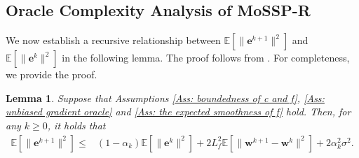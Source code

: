 \documentclass{article}
\theoremstyle{plain}
\newtheorem{lemma}{Lemma}[section]
\theoremstyle{definition}
\theoremstyle{remark}
\newcommand{\EE}{\mathbb{E}}
\newcommand{\be}{\bm{e}}
\newcommand{\bw}{\bm{w}}
\numberwithin{equation}{section}
\begin{document}
\subsection{\bf{Oracle Complexity Analysis of MoSSP-R}}
\label{Subsection: Lemmas for Oracle complexity analysis of Algo 2}
We now establish a recursive relationship between $\EE[\| \be^{k+1}\|^{2}]$ and $\EE[\| \be^{k}\|^{2}]$ in the following lemma. The proof follows from \citet{xu2023momentum}.
For completeness, we provide the proof.
\begin{lemma}
    \label{Lemma: Recursive bound on gradient error for storm}
    Suppose that Assumptions \ref{Ass: boundedness of c and f}, \ref{Ass: unbiased gradient oracle} and \ref{Ass: the expected smoothness of f} hold.
    Then, for any $k \geq 0$, it holds that
\begin{align}
        \label{Eq: the stochastic error of the variance estimator}
        \EE\left[\| \be^{k+1}\|^{2}\right]
        \leq{} & (1 - \alpha_{k}) \EE\left[\| \be^{k}\|^{2}\right] + 2L^2_{f}\EE\left[ \| \bw^{k+1}- \bw^{k}\|^{2}\right]
        + 2\alpha_{k}^{2}\sigma^{2}.
    \end{align}
\end{lemma}
\end{document}
